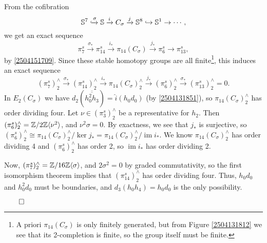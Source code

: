 \documentclass{MetricNotes2023}
\def\bb{\ensuremath\mathbb}
\def\subq{\ensuremath\subseteq}
\def\inj{\ensuremath\hookrightarrow}
\def\xinj{\ensuremath\xhookrightarrow}
\def\inte{\ensuremath\mathbb{Z}}
\DeclareMathOperator{\im}{im}
\def\done{\begin{flushright}\vspace{-4.35ex}\(\qed\)\end{flushright}}
\begin{document}
\begin{ourproof}
From the cofibration 
\[\bb{S}^7 \xinj{\sigma} \bb{S} \xrightarrow{i}C_\sigma \xrightarrow{j}\bb{S}^8 \inj \bb{S}^1 \to\cdots,\]
we get an exact sequence
\[\pi_{7}^s \xrightarrow{\sigma_*} \pi_{14}^s \xrightarrow{i_*} \pi_{14}(C_\sigma) \xrightarrow{j_*} \pi_6^s \to \pi_{13}^s,\]
by \ref{2504151709}. Since these stable homotopy groups are all finite\footnote{A priori \(\pi_{14}(C_\sigma)\) is only finitely generated, but from Figure \ref{2504131812} we see that its 2-completion is finite, so the group itself must be finite.}, this induces an exact sequence %
\[(\pi_{7}^s)^\wedge_2 \xrightarrow{\sigma_*} (\pi_{14}^s)^\wedge_2 \xrightarrow{i_*} \pi_{14}(C_\sigma)^\wedge_2 \xrightarrow{j_*} (\pi_6^s)^\wedge_2 \xrightarrow{\sigma_*} (\pi_{13}^s)^\wedge_2=0.\]
In \(E_2(C_\sigma)\) we have \(d_2(\overline{\overline{h_0^2h_3}})=\hat i(h_0d_0)\) (by \ref{2504131851}), so \(\pi_{14}(C_\sigma)^\wedge_2\) has order dividing four. Let \(\nu \in (\pi_3^s)^\wedge_2\) be a representative for \(h_2\). Then \((\pi_6^s)^\wedge_2=\inte/2\inte \ang{\nu^2}\), and \(\nu^2 \sigma=0\). By exactness, we see that \(j_*\) is surjective, so \((\pi_6^s)^\wedge_2\cong \pi_{14}(C_\sigma)^\wedge_2/\ker j_*=\pi_{14}(C_\sigma)^\wedge_2/\im i_*\). We know \(\pi_{14}(C_\sigma)^\wedge_2\) has order dividing 4 and \((\pi_6^s)^\wedge_2\) has order 2, so \(\im i_*\) has order dividing 2. 

Now, \((\pi_7^s)^\wedge_2=\inte/16\inte \ang{\sigma}\), and \(2 \sigma^2=0\) by graded commutativity, so the first isomorphism theorem implies that \((\pi_{14}^s)^\wedge_2\) has order dividing four. Thus, \(h_0d_0\) and \(h_0^2d_0\) must be boundaries, and \(d_3(h_0h_4)=h_0d_0\) is the only possibility.
\done
\end{ourproof}


\end{document}
